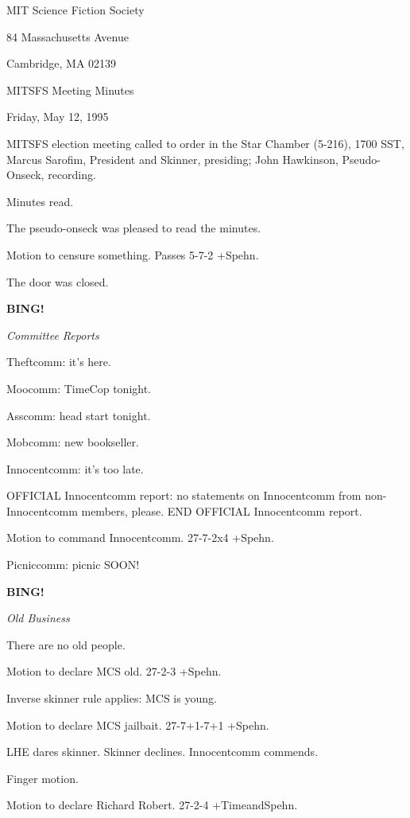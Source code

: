 \documentclass[12pt]{article}
\newcommand{\bing}{{\bf BING!} }
\newcommand{\goto}[1]{\bing \vskip 12pt \centerline{{\em{#1}}}}
\begin{document}
\begin{center}

MIT Science Fiction Society 

84 Massachusetts Avenue

Cambridge, MA 02139

\vspace{12pt}

MITSFS Meeting Minutes 

Friday, May 12, 1995

\end{center}
 
\vspace{18pt}

\setlength{\parskip}{6pt}

\noindent
MITSFS election meeting called to order in the Star Chamber (5-216), 1700 SST,
Marcus Sarofim, President and Skinner, presiding; John Hawkinson, Pseudo-Onseck, recording.

Minutes read.

The pseudo-onseck was pleased to read the minutes.

Motion to censure something. Passes 5-7-2 +Spehn.

The door was closed.

\goto{Committee Reports}

Theftcomm: it's here.

Moocomm: TimeCop tonight.

Asscomm: head start tonight.

Mobcomm: new bookseller.

Innocentcomm: it's too late.

OFFICIAL Innocentcomm report: no statements on Innocentcomm from non-Innocentcomm members, please. END OFFICIAL Innocentcomm report.

Motion to command Innocentcomm. 27-7-2x4 +Spehn.

Picniccomm: picnic SOON!

\goto{Old Business}

There are no old people.

Motion to declare MCS old. 27-2-3 +Spehn.

Inverse skinner rule applies: MCS is young.

Motion to declare MCS jailbait. 27-7+1-7+1 +Spehn.

LHE dares skinner. Skinner declines. Innocentcomm commends.

Finger motion.

Motion to declare Richard Robert. 27-2-4 +TimeandSpehn.
\end{document}
